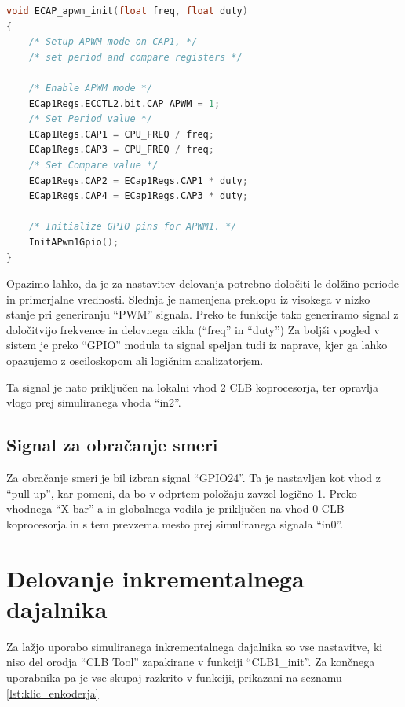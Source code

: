 \documentclass[a4paper]{article}
\begin{document}
\begin{sloppypar}
\filbreak
\begin{lstlisting}[language=C,
                   caption={Implementacija funkcije za usposobitev ``eCAP'' 
                            modula v ``apwm'' načinu},
                   label={lst:ecap_init}]
void ECAP_apwm_init(float freq, float duty)
{
    /* Setup APWM mode on CAP1, */
    /* set period and compare registers */

    /* Enable APWM mode */
    ECap1Regs.ECCTL2.bit.CAP_APWM = 1;
    /* Set Period value */
    ECap1Regs.CAP1 = CPU_FREQ / freq;
    ECap1Regs.CAP3 = CPU_FREQ / freq;
    /* Set Compare value */
    ECap1Regs.CAP2 = ECap1Regs.CAP1 * duty;
    ECap1Regs.CAP4 = ECap1Regs.CAP3 * duty;

    /* Initialize GPIO pins for APWM1. */
    InitAPwm1Gpio();
}
\end{lstlisting}

Opazimo lahko, da je za nastavitev delovanja potrebno določiti le dolžino periode in
primerjalne vrednosti. Slednja je namenjena preklopu iz visokega v nizko stanje
pri generiranju ``PWM'' signala. Preko te funkcije tako generiramo signal z
določitvijo frekvence in delovnega cikla (``freq'' in ``duty'') Za boljši
vpogled v sistem je preko ``GPIO'' modula ta signal speljan tudi iz naprave,
kjer ga lahko opazujemo z osciloskopom ali logičnim analizatorjem.

Ta signal je nato priključen na lokalni vhod 2 CLB koprocesorja, ter opravlja
vlogo prej simuliranega vhoda ``in2''.

\subsection{Signal za obračanje smeri}
Za obračanje smeri je bil izbran signal ``GPIO24''. Ta je nastavljen kot vhod z
``pull-up'', kar pomeni, da bo v odprtem položaju zavzel logično 1. Preko
vhodnega ``X-bar''-a in globalnega vodila je priključen na vhod 0 CLB
koprocesorja in s tem prevzema mesto prej simuliranega signala ``in0''.

\section{Delovanje inkrementalnega dajalnika}
Za lažjo uporabo simuliranega inkrementalnega dajalnika so vse nastavitve, ki
niso del orodja ``CLB Tool'' zapakirane v funkciji ``CLB1\_init''. Za končnega
uporabnika pa je vse skupaj razkrito v funkciji, prikazani na seznamu
\ref{lst:klic_enkoderja}


\end{sloppypar}
\end{document}
